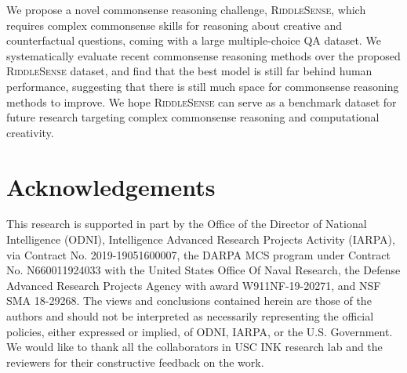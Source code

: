  We propose a novel commonsense reasoning challenge, \textsc{RiddleSense}, which requires complex commonsense skills for reasoning about creative and counterfactual questions, coming with a large multiple-choice QA dataset.  
 We systematically evaluate recent commonsense reasoning methods over the proposed \textsc{RiddleSense} dataset, and find that the best model is still far behind human performance, suggesting that there is still much space for commonsense reasoning methods to improve.
 We hope \textsc{RiddleSense} can serve as a benchmark dataset for future research targeting complex commonsense reasoning and computational creativity.


\section*{Acknowledgements}
This research is supported in part by the Office of the Director of National Intelligence (ODNI), Intelligence Advanced Research Projects Activity (IARPA), via Contract No. 2019-19051600007, the DARPA MCS program under Contract No. N660011924033 with the United States Office Of Naval Research, the Defense Advanced Research Projects Agency with award W911NF-19-20271, and NSF SMA 18-29268. The views and conclusions contained herein are those of the authors and should not be interpreted as necessarily representing the official policies, either expressed or implied, of ODNI, IARPA, or the U.S. Government. We would like to thank all the collaborators in USC INK research lab and the reviewers for their constructive feedback on the work.